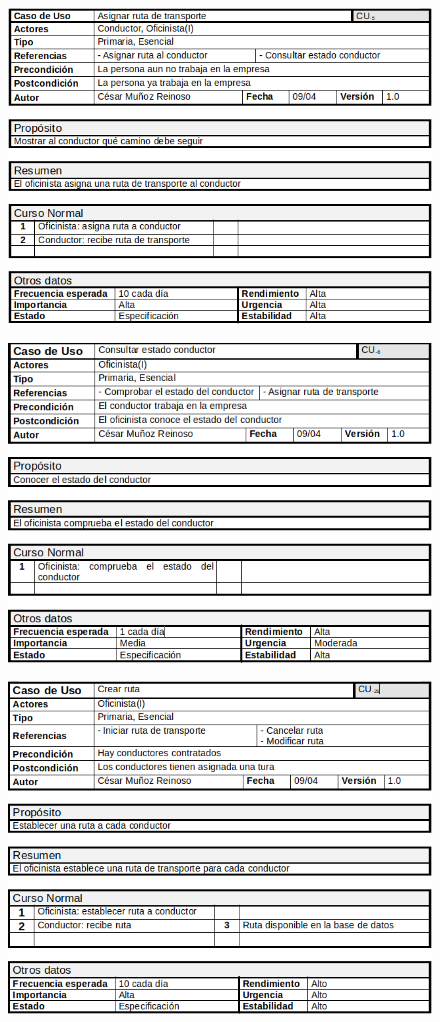 \begin{figure}[H]
	\centering
	\includegraphics[width=16cm]{5}
\end{figure}
\begin{figure}[H]
	\centering
	\includegraphics[width=16cm]{6}
\end{figure}
\begin{figure}[H]
	\centering
	\includegraphics[width=16cm]{7}
\end{figure}
